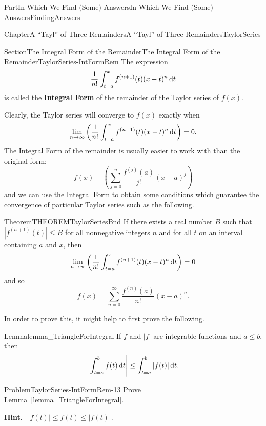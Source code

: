 \documentclass[oneside,10pt,]{book}
\newcommand{\blocktitlefont}{\relax}
\newcommand{\xreffont}{\relax}
\newcommand{\terminology}[1]{\textbf{#1}}
\numberwithin{equation}{part}
\newcommand{\dx}[1]{\,{\rm d}#1}
\newcommand{\abs}[1]{\left|#1\right|}
\def\limit#1#2#3{{\displaystyle\lim_{#1\rightarrow #2}#3}}
\begin{document}
\begin{partptx}{Part}{In Which We Find (Some) Answers}{}{In Which We Find (Some) Answers}{}{}{FindingAnswers}
\begin{chapterptx}{Chapter}{A ``Tayl'' of Three Remainders}{}{A ``Tayl'' of Three Remainders}{}{}{TaylorSeries}
\begin{sectionptx}{Section}{The Integral Form of the Remainder}{}{The Integral Form of the Remainder}{}{}{TaylorSeries-IntFormRem}
The expression%
\begin{equation}
\frac{1}{n!}\int_{t=a}^xf^{(n+1)}(t)(x-t)^n\dx{ t}\label{EQUATIONIntFormRemainder}
\end{equation}
is called the \terminology{Integral Form} of the remainder of the Taylor series of \(f(x)\).%
\par
Clearly, the Taylor series will converge to \(f(x)\) exactly when%
\begin{equation*}
\limit{n}{\infty}{\left(\frac{1}{n!}\int_{t=a}^xf^{(n+1)}(t)(x-t)^n\dx{t}
\right)}=0 \text{.}
\end{equation*}
The \hyperref[EQUATIONIntFormRemainder]{Integral Form} of the remainder is usually easier to work with than the original form:%
\begin{equation*}
f(x)-\left(\sum_{j=0}^n\frac{f^{(j)}(a)}{j!}(x-a)^j\right)
\end{equation*}
and we can use the \hyperref[EQUATIONIntFormRemainder]{Integral Form} to obtain some conditions which guarantee the convergence of particular Taylor series such as the following.%
\begin{theorem}{Theorem}{}{}{THEOREMTaylorSeriesBnd}%
%
If there exists a real number \(B\) such that \(|f^{(n+1)}(t)|\leq B\) for all nonnegative integers \(n\) and for all \(t\) on an interval containing \(a\) and \(x\), then%
\begin{equation*}
\limit{n}{\infty}{\left(\frac{1}{n!}\int_{t=a}^xf^{(n+1)}(t)(x-t)^n\dx{ t}\right)}=0
\end{equation*}
and so%
\begin{equation*}
f(x)=\sum_{n=0}^\infty\frac{f^{(n)}(a)}{n!}(x-a)^n.{}
\end{equation*}
%
\end{theorem}
In order to prove this, it might help to first prove the following.%
\begin{lemma}{Lemma}{}{}{lemma_TriangleForIntegral}%
If \(f\) and \(\abs{f}\) are integrable functions and \(a\leq b\), then%
\begin{equation*}
\left|\int_{t=a}^bf(t)\dx{ t}\right|\leq\int_{t=a}^b|f(t)|\dx{ t}. {}
\end{equation*}
%
\end{lemma}
\begin{problem}{Problem}{}{TaylorSeries-IntFormRem-13}%
Prove \hyperref[lemma_TriangleForIntegral]{Lemma~{\xreffont\ref{lemma_TriangleForIntegral}}}.%
\par\smallskip%
\noindent\textbf{\blocktitlefont Hint}.\hypertarget{TaylorSeries-IntFormRem-13-3}{}\quad{}\(-|f(t)|\leq f(t)\leq|f(t)|\).%

\end{problem}
\end{sectionptx}
\end{chapterptx}
\end{partptx}
\end{document}
